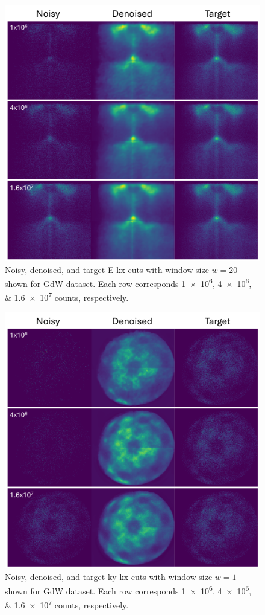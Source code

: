 \begin{figure}[h]
    \centering
    \includegraphics[width=1\linewidth]{images/nn_denoised_ex_20_slice.pdf}
    \caption{Noisy, denoised, and target \gls{E}-\gls{kx} cuts with window size $w=20$ shown for \gls{GdW} dataset. Each row corresponds \numlist{1e6;4e6;1.6e7} counts, respectively.}
    \label{fig:nn-denoised-ex-20-slice}
\end{figure}

\begin{figure}[h]
    \centering
    \includegraphics[width=1\linewidth]{images/nn_denoised_xy_single_slice.pdf}
    \caption{Noisy, denoised, and target \gls{ky}-\gls{kx} cuts with window size $w=1$ shown for \gls{GdW} dataset. Each row corresponds \numlist{1e6;4e6;1.6e7} counts, respectively.}
    \label{fig:nn-denoised-xy-single-slice}
\end{figure}

